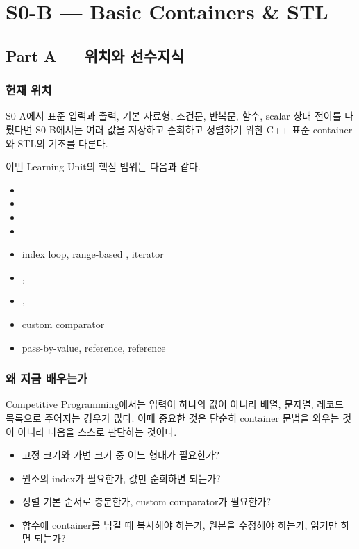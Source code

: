 \chapter{S0-B --- Basic Containers \& STL}

\section{Part A --- 위치와 선수지식}

\subsection{현재 위치}
S0-A에서 표준 입력과 출력, 기본 자료형, 조건문, 반복문, 함수, scalar 상태 전이를 다뤘다면 S0-B에서는 여러 값을 저장하고 순회하고 정렬하기 위한 C++ 표준 container와 STL의 기초를 다룬다.

이번 Learning Unit의 핵심 범위는 다음과 같다.
\begin{itemize}
  \item {}
  \item {}
  \item {}
  \item {}
  \item index loop, range-based , iterator
  \item {}, 
  \item {}, 
  \item custom comparator
  \item pass-by-value, reference,  reference
\end{itemize}

\subsection{왜 지금 배우는가}
Competitive Programming에서는 입력이 하나의 값이 아니라 배열, 문자열, 레코드 목록으로 주어지는 경우가 많다. 이때 중요한 것은 단순히 container 문법을 외우는 것이 아니라 다음을 스스로 판단하는 것이다.
\begin{itemize}
  \item 고정 크기와 가변 크기 중 어느 형태가 필요한가?
  \item 원소의 index가 필요한가, 값만 순회하면 되는가?
  \item 정렬 기본 순서로 충분한가, custom comparator가 필요한가?
  \item 함수에 container를 넘길 때 복사해야 하는가, 원본을 수정해야 하는가, 읽기만 하면 되는가?
\end{itemize}

